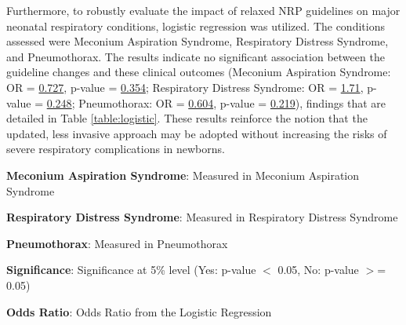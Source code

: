 \documentclass[11pt]{article}
\begin{document}
Furthermore, to robustly evaluate the impact of relaxed NRP guidelines on major neonatal respiratory conditions, logistic regression was utilized. The conditions assessed were Meconium Aspiration Syndrome, Respiratory Distress Syndrome, and Pneumothorax. The results indicate no significant association between the guideline changes and these clinical outcomes (Meconium Aspiration Syndrome: OR = \hyperlink{C0a}{0.727}, p-value = \hyperlink{C0b}{0.354}; Respiratory Distress Syndrome: OR = \hyperlink{C1a}{1.71}, p-value = \hyperlink{C1b}{0.248}; Pneumothorax: OR = \hyperlink{C2a}{0.604}, p-value = \hyperlink{C2b}{0.219}), findings that are detailed in Table {}\ref{table:logistic}. These results reinforce the notion that the updated, less invasive approach may be adopted without increasing the risks of severe respiratory complications in newborns.

\begin{table}[h]
\caption{\protect\hyperlink{file-table-2-pkl}{Logistic regression impact of the NRP guideline change on occurrence of Meconium Aspiration Syndrome, Respiratory Distress Syndrome, and Pneumothorax; considers confounders}}
\label{table:logistic}
\begin{threeparttable}
\renewcommand{\TPTminimum}{\linewidth}
\begin{tablenotes}
\footnotesize
\item \textbf{Meconium Aspiration Syndrome}: Measured in Meconium Aspiration Syndrome
\item \textbf{Respiratory Distress Syndrome}: Measured in Respiratory Distress Syndrome
\item \textbf{Pneumothorax}: Measured in Pneumothorax
\item \textbf{Significance}: Significance at 5\% level (Yes: p-value $<$ 0.05, No: p-value $>$= 0.05)
\item \textbf{Odds Ratio}: Odds Ratio from the Logistic Regression
\end{tablenotes}
\end{threeparttable}
\end{table}
\end{document}
